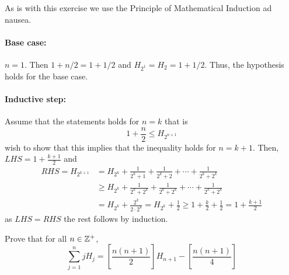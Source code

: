 \documentclass[a4paper, english, 12pt]{article} %
\newcommand{\solutions}{true} %
\begin{document}
\begin{answer}
  As is with this exercise we use the Principle of Mathematical Induction
  ad nausea. \paragraph{Base case:} $n=1$. Then $1 + n/2 = 1 + 1/2$ and $H_{2^1} = H_2
  = 1 + 1/2$. Thus, the hypothesis holds for the base case.
  \paragraph{Inductive step:} Assume that the statements holds for $n=k$ that is
  \begin{equation*}
    1 + \frac{n}{2} \leq H_{2^{n+1}}
  \end{equation*}
  wish to show that this implies that the inequality holds for $n=k+1$. Then,
  $LHS = 1 + \frac{k+1}{2}$ and
  \begin{align*}
    RHS = H_{2^{k+1}}
    & = H_{2^k} + \frac{1}{2^k+1} + \frac{1}{2^k + 2} + \cdots + \frac{1}{2^k + 2^k} \\
    & \geq H_{2^k} + \frac{1}{2^k+2^k} + \frac{1}{2^k + 2^k} + \cdots + \frac{1}{2^k + 2^k} \\
    & = H_{2^k} + \frac{2^k}{2 \cdot 2^k}
      = H_{2^{k}} + \frac{1}{2}
      \geq 1 + \frac{k}{2} + \frac{1}{2} = 1 + \frac{k+1}{2}
  \end{align*}
  as $LHS = RHS$ the rest follows by induction. 
\end{answer}

\ifthenelse{\boolean{\solutions}}{\newpage}{}

\begin{subproblem}
  Prove that for all $n \in \mathbb{Z}^+$,
  \begin{equation*}
    \sum_{j=1}^n j H_j
    = \left[ \frac{n(n+1)}{2} \right] H_{n+1} - \left[ \frac{n(n+1)}{4} \right]
  \end{equation*}
\end{subproblem}
\end{document}
